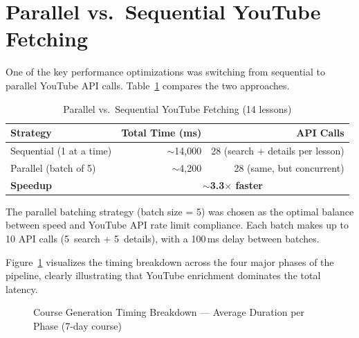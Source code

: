 \documentclass[12pt,a4paper]{report}
\begin{document}
\section{Parallel vs.\ Sequential YouTube Fetching}

One of the key performance optimizations was switching from sequential to parallel YouTube API calls. Table~\ref{tab:parallel-comparison} compares the two approaches.

\begin{table}[H]
\centering
\caption{Parallel vs.\ Sequential YouTube Fetching (14 lessons)}
\label{tab:parallel-comparison}
\begin{tabular}{l r r}
\toprule
\textbf{Strategy}         & \textbf{Total Time (ms)} & \textbf{API Calls} \\
\midrule
Sequential (1 at a time)  & $\sim$14{,}000            & 28 (search + details per lesson) \\
Parallel (batch of 5)     & $\sim$4{,}200             & 28 (same, but concurrent) \\
\midrule
\textbf{Speedup}          & \multicolumn{2}{c}{\textbf{$\sim$3.3$\times$ faster}} \\
\bottomrule
\end{tabular}
\end{table}

The parallel batching strategy (batch size = 5) was chosen as the optimal balance between speed and YouTube API rate limit compliance. Each batch makes up to 10 API calls (5~search + 5~details), with a 100\,ms delay between batches.

Figure~\ref{fig:perf-bar} visualizes the timing breakdown across the four major phases of the pipeline, clearly illustrating that YouTube enrichment dominates the total latency.

\begin{figure}[H]
    \centering
    \caption{Course Generation Timing Breakdown --- Average Duration per Phase (7-day course)}
    \label{fig:perf-bar}
\end{figure}
\end{document}
